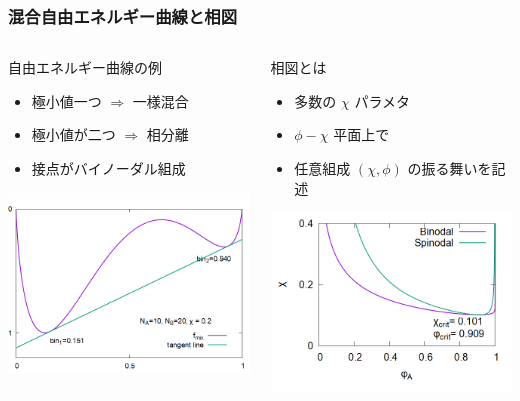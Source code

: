 \documentclass[12pt, dvipdfmx]{beamer}
\begin{document}
\begin{frame}\frametitle{混合自由エネルギー曲線と相図}
    \begin{columns}[c, onlytextwidth]
            \begin{block}{自由エネルギー曲線の例}
                \begin{itemize}
					\item 極小値一つ $\Rightarrow$ 一様混合
					\item 極小値が二つ $\Rightarrow$ 相分離
					\item 接点がバイノーダル組成
				\end{itemize}
                \centering
					\includegraphics[width=.9\textwidth]{FE_tan_A10B20Chi0_2.png}
            \end{block}
        \begin{exampleblock}{相図とは}
            \begin{itemize}
                \item 多数の $\chi$ パラメタ
                \item $\phi-\chi$ 平面上で
                \item 任意組成 $(\chi, \phi)$ の振る舞いを記述
            \end{itemize}
            \centering
                \includegraphics[width=.9\textwidth]{PD_6_600.png}

\end{exampleblock}
\end{columns}
\end{frame}
\end{document}
